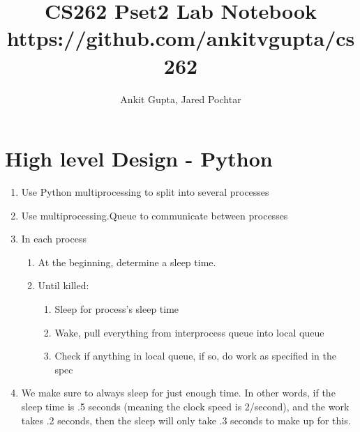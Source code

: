 \documentclass[]{article}
\begin{document}
%
\title{CS262 Pset2 Lab Notebook \\ \large https://github.com/ankitvgupta/cs262}
%
%
%

\author{Ankit Gupta, Jared Pochtar}


\maketitle

\section{High level Design - Python}
\begin{enumerate}
  \item Use Python multiprocessing to split into several processes
  \item Use multiprocessing.Queue to communicate between processes
  \item In each process
  \begin{enumerate}
    \item At the beginning, determine a sleep time.
    \item Until killed:
    \begin{enumerate}
      \item Sleep for process’s sleep time
      \item Wake, pull everything from interprocess queue into local queue
      \item Check if anything in local queue, if so, do work as specified in the spec
    \end{enumerate}
  \end{enumerate}
  \item We make sure to always sleep for just enough time. In other words, if the sleep time is .5 seconds (meaning the clock speed is 2/second), and the work takes .2 seconds, then the sleep will only take .3 seconds to make up for this.
\end{enumerate}
\end{document}
